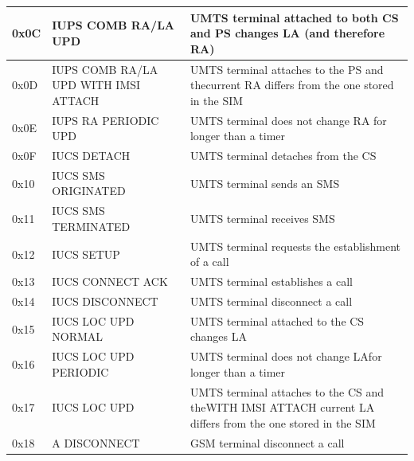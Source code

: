 \documentclass[master,english]{hgbthesis}
\begin{document}
{\begin{longtable}{|l|p{4cm}|p{8cm}|}
		0x0C         & IUPS COMB RA/LA UPD                  & UMTS terminal attached to both CS and PS changes LA (and therefore RA)                                     \\ \hline
		0x0D         & IUPS COMB RA/LA UPD WITH IMSI ATTACH & UMTS terminal attaches to the PS and thecurrent RA differs from the one stored in the SIM                  \\ \hline
		0x0E         & IUPS RA PERIODIC UPD                 & UMTS terminal does not change RA for longer than a timer                                                   \\ \hline
		0x0F         & IUCS DETACH                          & UMTS terminal detaches from the CS                                                                         \\ \hline
		0x10         & IUCS SMS ORIGINATED                  & UMTS terminal sends an SMS                                                                                 \\ \hline
		0x11         & IUCS SMS TERMINATED                  & UMTS terminal receives SMS                                                                                 \\ \hline
		0x12         & IUCS SETUP                           & UMTS terminal requests the establishment of a call                                                         \\ \hline
		0x13         & IUCS CONNECT ACK                     & UMTS terminal establishes a call                                                                           \\ \hline
		0x14         & IUCS DISCONNECT                      & UMTS terminal disconnect a call                                                                            \\ \hline
		0x15         & IUCS LOC UPD NORMAL                  & UMTS terminal attached to the CS changes LA                                                                \\ \hline
		0x16         & IUCS LOC UPD PERIODIC                & UMTS terminal does not change LAfor longer than a timer                                                    \\ \hline
		0x17         & IUCS LOC UPD                         & UMTS terminal attaches to the CS and theWITH IMSI ATTACH current LA differs from the one stored in the SIM \\ \hline
		0x18         & A DISCONNECT                         & GSM terminal disconnect a call                                                                             \\ \hline

\end{longtable}}
\end{document}
